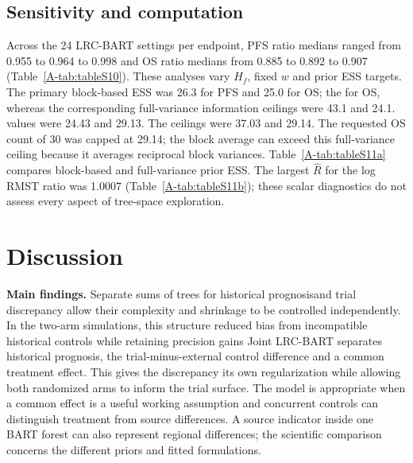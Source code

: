 \documentclass[11pt]{article}
\newcommand{\lrc}{LRC-BART} %
\theoremstyle{remark}\newtheorem{remark}{Remark}[section]
\providecommand{\DIFaddtex}[1]{{\protect\color{blue} \sf #1}} %
\providecommand{\DIFdeltex}[1]{{\protect\color{red} \scriptsize #1}} %
\providecommand{\DIFaddbegin}{} %
\providecommand{\DIFaddend}{} %
\providecommand{\DIFdelbegin}{} %
\providecommand{\DIFdelend}{} %
\providecommand{\DIFadd}[1]{\texorpdfstring{\DIFaddtex{#1}}{#1}} %
\providecommand{\DIFdel}[1]{\texorpdfstring{\DIFdeltex{#1}}{}} %
\begin{document}
\subsection{Sensitivity and computation}
Across the 24 \lrc{} settings per endpoint, PFS ratio medians ranged from \DIFdelbegin \DIFdel{0.955 to 0.964 }\DIFdelend \DIFaddbegin \DIFadd{0.984 to 0.998 }\DIFaddend and OS ratio medians from \DIFdelbegin \DIFdel{0.885 to 0.892 }\DIFdelend \DIFaddbegin \DIFadd{0.897 to 0.907 }\DIFaddend (Table~\ref{A-tab:tableS10}). These analyses vary $H_f$, fixed $w$ and prior ESS targets. The primary block-based ESS was \DIFdelbegin \DIFdel{26.3 }\DIFdelend \DIFaddbegin \DIFadd{24.70 }\DIFaddend for PFS and \DIFdelbegin \DIFdel{25.0 for OS; the }\DIFdelend \DIFaddbegin \DIFadd{30.04 for OS, whereas the corresponding }\DIFaddend full-variance \DIFdelbegin \DIFdel{information ceilings were 43.1 and 24.1. }\DIFdelend \DIFaddbegin \DIFadd{values were 24.43 and 29.13. The ceilings were 37.03 and 29.14. The requested OS count of 30 was capped at 29.14; the block average can exceed this full-variance ceiling because it averages reciprocal block variances. }\DIFaddend Table~\ref{A-tab:tableS11a} compares block-based and full-variance prior ESS. The largest $\widehat R$ for the log RMST ratio was 1.0007 (Table~\ref{A-tab:tableS11b}); these scalar diagnostics do not assess every aspect of tree-space exploration.

\section{Discussion}
\DIFdelbegin %
\DIFdel{\textbf{Main findings.}
Separate sums of trees for historical prognosisand trial discrepancy allow their complexity and shrinkage to be controlled independently. In the two-arm simulations, this structure reduced bias from incompatible historical controls while retaining precision gains }\DIFdelend \DIFaddbegin \DIFadd{Joint LRC-BART separates historical prognosis, the trial-minus-external control difference and a common treatment effect. This gives the discrepancy its own regularization while allowing both randomized arms to inform the trial surface. The model is appropriate when a common effect is a useful working assumption and concurrent controls can distinguish treatment from source differences. A source indicator inside one BART forest can also represent regional differences; the scientific comparison concerns the different priors and fitted formulations.
}
\end{document}
